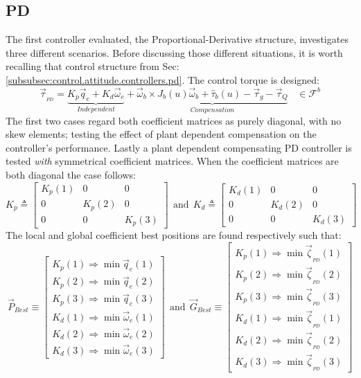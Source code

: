 \subsection{PD}
\label{subsec:simulation.attitude.pd}
The first controller evaluated, the Proportional-Derivative structure, investigates three different scenarios. Before discussing those different situations, it is worth recalling that control structure from Sec:\ref{subsubsec:control.attitude.controllers.pd}. The control torque is designed:
\begin{equation}\label{eq:simulation-attitde-pd}
\vec{\tau}_{_{PD}}=\underbrace{K_p\vec{q}_e+K_d\vec{\omega}_e}_{Independent}+\underbrace{\vec{\omega}_b\times J_b(u)\vec{\omega}_b+\hat{\tau}_b(u)-\vec{\tau}_g-\vec{\tau}_Q}_{Compensation}~~~~\in\mathcal{F}^{b}
\end{equation}
The first two cases regard both coefficient matrices as purely diagonal, with no skew elements; testing the effect of plant dependent compensation on the controller's performance. Lastly a plant dependent compensating PD controller is tested \emph{with} symmetrical coefficient matrices. When the coefficient matrices are both diagonal the case follows:
\begin{equation}\label{eq:simulation-attitde-pd-diagonal-coefficients}
K_p\triangleq \begin{bmatrix}
K_p(1) & 0 & 0\\
0 & K_p(2) & 0\\
0 & 0 & K_p(3)
\end{bmatrix}
~~\text{and}~~K_d\triangleq \begin{bmatrix}
K_d(1) & 0 & 0\\
0 & K_d(2) & 0\\
0 & 0 & K_d(3)
\end{bmatrix}
\end{equation}
The local and global coefficient best positions are found respectively such that:
\begin{equation}
\vec{P}_{Best}\equiv
\begin{bmatrix}
K_p(1)\Rightarrow \min \vec{q}_e(1)\\
K_p(2)\Rightarrow \min \vec{q}_e(2)\\
K_p(3)\Rightarrow \min \vec{q}_e(3)\\
K_d(1)\Rightarrow \min \vec{\omega}_e(1)\\
K_d(2)\Rightarrow \min \vec{\omega}_e(2)\\
K_d(3)\Rightarrow \min \vec{\omega}_e(3)
\end{bmatrix}~~\text{and}~~\vec{G}_{Best}\equiv\begin{bmatrix}
K_p(1)\Rightarrow \min \vec{\zeta}_{_{PD}}(1)\\
K_p(2)\Rightarrow \min \vec{\zeta}_{_{PD}}(2)\\
K_p(3)\Rightarrow \min \vec{\zeta}_{_{PD}}(3)\\
K_d(1)\Rightarrow \min \vec{\zeta}_{_{PD}}(1)\\
K_d(2)\Rightarrow \min \vec{\zeta}_{_{PD}}(2)\\
K_d(3)\Rightarrow \min \vec{\zeta}_{_{PD}}(3)
\end{bmatrix}
\end{equation}
